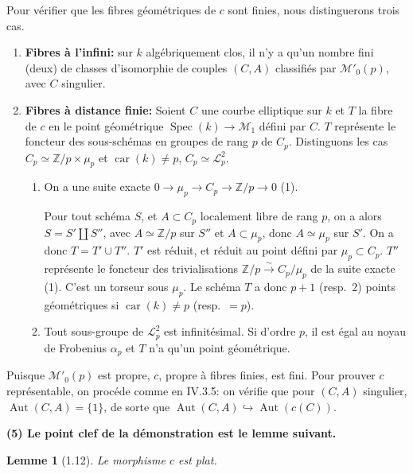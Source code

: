 \documentclass[11pt,a4paper]{amsart}
\theoremstyle{plain}
\newtheorem{lemma}[theorem]{Lemme}
\theoremstyle{definition}
\DeclareMathOperator{\Aut}{Aut}
\DeclareMathOperator{\Spec}{Spec}
\newcommand{\CL}{\mathcal{L}}
\newcommand{\mll}{\mathcal{M}}
\DeclareMathOperator{\car}{car}
\newcommand{\ZZ}{\mathbb{Z}}
\begin{document}
Pour v\'erifier que les fibres g\'eom\'etriques de $c$ sont finies, nous distinguerons trois cas.

\begin{enumerate}[label=\alph*)]
\item \textbf{Fibres \`a l'infini:} sur $k$ alg\'ebriquement clos, il n'y a qu'un nombre fini (deux) de classes d'isomorphie de couples $(C,A)$ classifi\'es par $\mll'_0(p)$, avec $C$ singulier.

\item \textbf{Fibres \`a distance finie:} Soient $C$ une courbe elliptique sur $k$ et $T$ la fibre de $c$ en le point g\'eom\'etrique $\Spec(k) \to \mll_1$ d\'efini par $C$. $T$ repr\'esente le foncteur des sous-sch\'emas en groupes de rang $p$ de $C_p$. Distinguons les cas $C_p \simeq \ZZ/p \times \mu_p$ et $\car(k) \neq p$, $C_p \simeq \CL_p^2$.

\begin{enumerate}[label=b\arabic*)]
\item On a une suite exacte $0 \to \mu_p \to C_p \to \ZZ/p \to 0$ (1).

Pour tout sch\'ema $S$, et $A \subset C_p$ localement libre de rang $p$, on a alors $S = S' \amalg S''$, avec $A \simeq \ZZ/p$ sur $S''$ et $A \subset \mu_p$, donc $A \simeq \mu_p$ sur $S'$. On a donc $T = T' \cup T''$. $T'$ est r\'eduit, et r\'eduit au point d\'efini par $\mu_p \subset C_p$. $T''$ repr\'esente le foncteur des trivialisations $\ZZ/p \xrightarrow{\sim} C_p/\mu_p$ de la suite exacte (1). C'est un torseur sous $\mu_p$. Le sch\'ema $T$ a donc $p+1$ (resp.\ 2) points g\'eom\'etriques si $\car(k) \neq p$ (resp.\ $= p$).

\item Tout sous-groupe de $\CL_p^2$ est infinit\'esimal. Si d'ordre $p$, il est \'egal au noyau de Frobenius $\alpha_p$ et $T$ n'a qu'un point g\'eom\'etrique.
\end{enumerate}
\end{enumerate}

Puisque $\mll'_0(p)$ est propre, $c$, propre \`a fibres finies, est fini. Pour prouver $c$ repr\'esentable, on proc\'ede comme en IV.3.5: on v\'erifie que pour $(C,A)$ singulier, $\Aut(C,A) = \{1\}$, de sorte que $\Aut(C,A) \hookrightarrow \Aut(c(C))$.

\medskip

\noindent\textbf{(5) Le point clef de la d\'emonstration est le lemme suivant.}

\begin{lemma}[1.12]
Le morphisme $c$ est plat.
\end{lemma}
\end{document}
